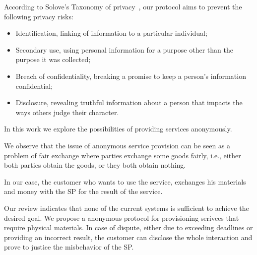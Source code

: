 \documentclass[pdftex,twocolumn,epjc3]{svjour3}
\begin{document}
According to Solove's Taxonomy of privacy~\cite{soloveTaxonomyPrivacy2006}, our protocol aims to prevent the following privacy risks:
\begin{itemize}
    \item Identification, linking of information to a particular individual;
    \item Secondary use, using personal information for a purpose other than the purpose it was collected; 
    \item Breach of confidentiality, breaking a promise to keep a person's information confidential;
    \item Disclosure, revealing truthful information about a person that impacts the ways others judge their character.
\end{itemize}

In this work we explore the possibilities of providing services anonymously.

We observe that the issue of anonymous service provision can be seen as a problem of fair exchange where parties exchange some goods fairly, i.e., either both parties obtain the goods, or they both obtain nothing.

In our case, the customer who wants to use the service, exchanges his materials and money with the SP for the result of the service.

Our review indicates that none of the current systems is sufficient to achieve the desired goal. We propose a anonymous protocol for provisioning serivces that require physical materials. In case of dispute, either due to exceeding deadlines or providing an incorrect result, the customer can disclose the whole interaction and prove to justice the misbehavior of the SP.
\end{document}

